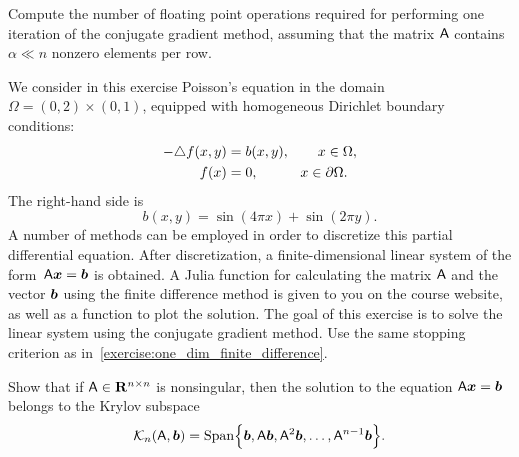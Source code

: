 \begin{exercise}
    Compute the number of floating point operations required for performing one iteration of the conjugate gradient method,
    assuming that the matrix $\mathsf A$ contains $\alpha \ll n$ nonzero elements per row.
\end{exercise}

\begin{compexercise}
    We consider in this exercise Poisson's equation in the domain $\Omega = (0, 2) \times (0, 1)$,
    equipped with homogeneous Dirichlet boundary conditions:
    \[
        \begin{aligned}
            - \triangle f(x, y) &= b(x, y), \qquad x \in \Omega, \\
            f(x) &= 0, \quad \qquad x \in \partial \Omega.
        \end{aligned}
    \]
    The right-hand side is
    \[
        b(x, y) = \sin(4\pi x) + \sin(2\pi y).
    \]
    A number of methods can be employed in order to discretize this partial differential equation.
    After discretization, a finite-dimensional linear system of the form~$\mathsf A \mathbf{\boldsymbol{x}} = \mathbf{\boldsymbol{b}}$ is obtained.
    A Julia function for calculating the matrix $\mathsf A$ and the vector $\mathbf{\boldsymbol{b}}$ using the finite difference method is given to you on the course website,
    as well as a function to plot the solution.
    The goal of this exercise is to solve the linear system using the conjugate gradient method.
    Use the same stopping criterion as in~\cref{exercise:one_dim_finite_difference}.
\end{compexercise}

\begin{exercise}
    Show that if $\mathsf A \in \mathbf R^{n \times n}$ is nonsingular,
    then the solution to the equation $\mathsf A \mathbf{\boldsymbol{x}} = \mathbf{\boldsymbol{b}}$ belongs to the Krylov subspace
    \[
        \mathcal K_n(\mathsf A, \mathbf{\boldsymbol{b}})
        = \operatorname{Span} \Bigl\{ \mathbf{\boldsymbol{b}}, \mathsf A \mathbf{\boldsymbol{b}}, \mathsf A^2 \mathbf{\boldsymbol{b}}, \dotsc, \mathsf A^{n-1} \mathbf{\boldsymbol{b}} \Bigr\}.
    \]
\end{exercise}

